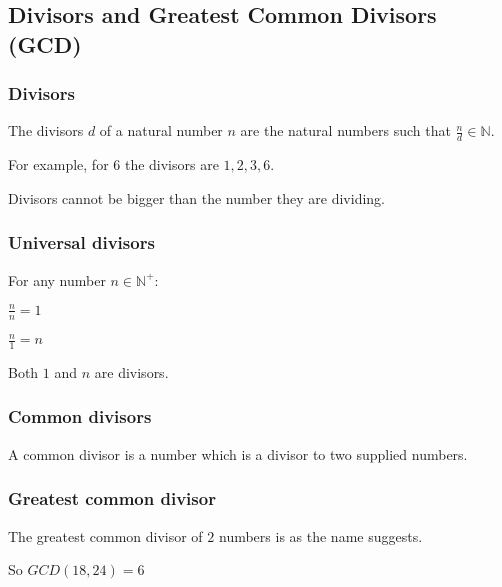
\subsection{Divisors and Greatest Common Divisors (GCD)}

\subsubsection{Divisors}

The divisors \(d\) of a natural number \(n\) are the natural numbers such that \(\frac{n}{d}\in \mathbb{N}\).

For example, for \(6\) the divisors are \(1, 2, 3, 6\).

Divisors cannot be bigger than the number they are dividing.

\subsubsection{Universal divisors}

For any number \(n \in \mathbb{N}^+\):

$\frac{n}{n}=1$

$\frac{n}{1}=n$

Both \(1\) and \(n\) are divisors.

\subsubsection{Common divisors}

A common divisor is a number which is a divisor to two supplied numbers.

\subsubsection{Greatest common divisor}

The greatest common divisor of \(2\) numbers is as the name suggests.

So \(GCD(18,24)=6\)

